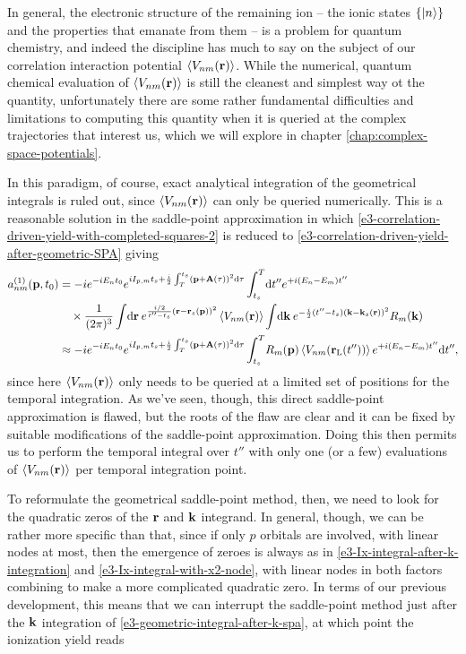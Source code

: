 In general, the electronic structure of the remaining ion -- the ionic states $\{\ket{n}\}$ and the properties that emanate from them -- is a problem for quantum chemistry, and indeed the discipline has much to say on the subject of our correlation interaction potential $\left\langle V_{nm}\mathopen{}\left( \vb{r} \right)\mathclose{} \right\rangle$. While the numerical, quantum chemical evaluation of $\left\langle V_{nm}\mathopen{}\left( \vb{r} \right)\mathclose{} \right\rangle$ is still the cleanest and simplest way ot the quantity, unfortunately there are some rather fundamental difficulties and limitations to computing this quantity when it is queried at the complex trajectories that interest us, which we will explore in chapter \ref{chap:complex-space-potentials}.

In this paradigm, of course, exact analytical integration of the geometrical integrals is ruled out, since $\left\langle V_{nm}\mathopen{}\left( \vb{r} \right)\mathclose{} \right\rangle$ can only be queried numerically. This is a reasonable solution in the saddle-point approximation in which \eqref{e3-correlation-driven-yield-with-completed-squares-2} is reduced to \eqref{e3-correlation-driven-yield-after-geometric-SPA} giving
\begin{align}
a_{nm}^{(1)}(\vb{p},{t_0})
& =
-i
e^{-iE_n {t_0}}
e^{iI_{p,m} {t_s}+\frac{i}{2} \int_T^{{t_s}}\left(\vb{p}+\vb{A}(\tau)\right)^2\mathrm{d}\tau} 
\int_{{t_s}}^T\!\mathrm{d} t''
e^{+i(E_n-E_m)t''}
\nonumber \\ & \quad \times
\frac{1}{(2\pi)^{3}}
\int\!\mathrm{d}\vb{r} \:
e^{\frac{i/2}{t''-{t_s}} (\vb{r}-\vb{r}_s(\vb{p}))^2}
\left\langle V_{nm}\mathopen{}\left( \vb{r} \right)\mathclose{} \right\rangle
\int\!\mathrm{d}\vb{k}  \:
e^{-\frac i2 (t''-{t_s}) (\vb{k}-\vb{k}_s(\vb{r}))^2}
R_m(\vb{k})
\nonumber \\ & \approx
-i
e^{-iE_n {t_0}}
e^{iI_{p,m} {t_s}+\frac{i}{2} \int_T^{{t_s}}\left(\vb{p}+\vb{A}(\tau)\right)^2\mathrm{d}\tau} 
\int_{{t_s}}^T\!
R_m(\vb{p})
\left\langle V_{nm}\mathopen{}\left( \vb{r}_\mathrm{L}(t'') \right)\mathclose{} \right\rangle
e^{+i(E_n-E_m)t''}
\mathrm{d} t''
,
\end{align}
since here $\left\langle V_{nm}\mathopen{}\left( \vb{r} \right)\mathclose{} \right\rangle$ only needs to be queried at a limited set of positions for the temporal integration. As we've seen, though, this direct saddle-point approximation is flawed, but the roots of the flaw are clear and it can be fixed by suitable modifications of the saddle-point approximation. Doing this then permits us to perform the temporal integral over $t''$ with only one (or a few) evaluations of $\left\langle V_{nm}\mathopen{}\left( \vb{r} \right)\mathclose{} \right\rangle$ per temporal integration point.


To reformulate the geometrical saddle-point method, then, we need to look for the quadratic zeros of the $\vb{r}$ and $\vb{k}$ integrand. In general, though, we can be rather more specific than that, since if only $p$ orbitals are involved, with linear nodes at most, then the emergence of zeroes is always as in \eqref{e3-Ix-integral-after-k-integration} and \eqref{e3-Ix-integral-with-x2-node}, with linear nodes in both factors combining to make a more complicated quadratic zero. In terms of our previous development, this means that we can interrupt the saddle-point method just after the $\vb{k}$ integration of \eqref{e3-geometric-integral-after-k-spa}, at which point the ionization yield reads

